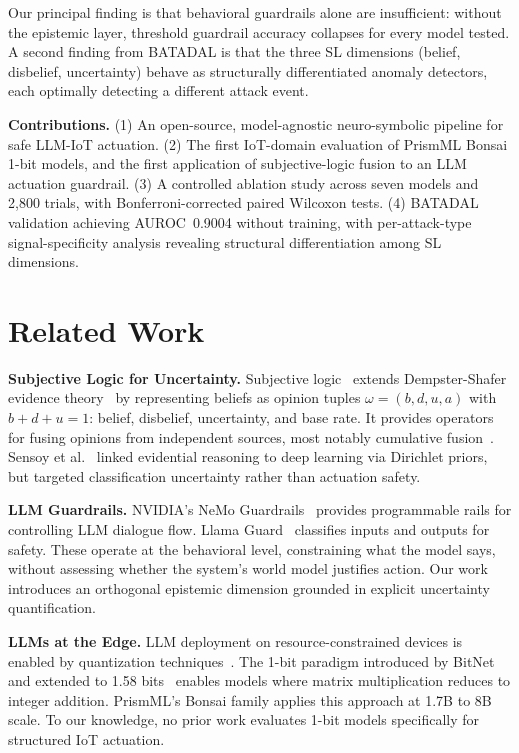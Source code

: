\documentclass[conference]{IEEEtran}
\begin{document}
Our principal finding is that behavioral guardrails alone are insufficient: without the epistemic layer, threshold guardrail accuracy collapses for every model tested. A second finding from BATADAL is that the three SL dimensions (belief, disbelief, uncertainty) behave as structurally differentiated anomaly detectors, each optimally detecting a different attack event.

\textbf{Contributions.}
(1) An open-source, model-agnostic neuro-symbolic pipeline for safe LLM-IoT actuation.
(2) The first IoT-domain evaluation of PrismML Bonsai 1-bit models, and the first application of subjective-logic fusion to an LLM actuation guardrail.
(3) A controlled ablation study across seven models and 2{,}800 trials, with Bonferroni-corrected paired Wilcoxon tests.
(4) BATADAL validation achieving AUROC~0.9004 without training, with per-attack-type signal-specificity analysis revealing structural differentiation among SL dimensions.

\section{Related Work}

\textbf{Subjective Logic for Uncertainty.}
Subjective logic~\cite{josang2016subjective} extends Dempster-Shafer evidence theory~\cite{dempster1968generalization, shafer1976mathematical} by representing beliefs as opinion tuples $\omega = (b, d, u, a)$ with $b + d + u = 1$: belief, disbelief, uncertainty, and base rate. It provides operators for fusing opinions from independent sources, most notably cumulative fusion~\cite{josang2016subjective}. Sensoy et al.~\cite{sensoy2018evidential} linked evidential reasoning to deep learning via Dirichlet priors, but targeted classification uncertainty rather than actuation safety.

\textbf{LLM Guardrails.}
NVIDIA's NeMo Guardrails~\cite{rebedea2023nemo} provides programmable rails for controlling LLM dialogue flow. Llama Guard~\cite{inan2023llama} classifies inputs and outputs for safety. These operate at the behavioral level, constraining what the model says, without assessing whether the system's world model justifies action. Our work introduces an orthogonal epistemic dimension grounded in explicit uncertainty quantification.

\textbf{LLMs at the Edge.}
LLM deployment on resource-constrained devices is enabled by quantization techniques~\cite{frantar2023gptq, lin2024awq}. The 1-bit paradigm introduced by BitNet~\cite{wang2023bitnet} and extended to 1.58 bits~\cite{ma2024era} enables models where matrix multiplication reduces to integer addition. PrismML's Bonsai family applies this approach at 1.7B to 8B scale. To our knowledge, no prior work evaluates 1-bit models specifically for structured IoT actuation.
\end{document}
